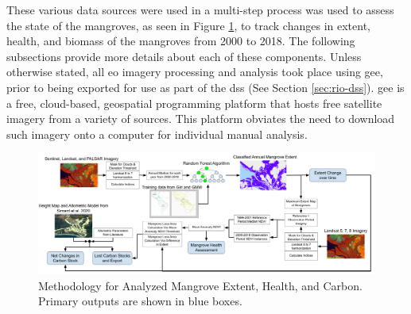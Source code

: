 These various data sources were used in a multi-step process was used to assess the state of the mangroves, as seen in Figure \ref{fig:extent_method}, to track changes in extent, health, and biomass of the mangroves from 2000 to 2018. The following subsections provide more details about each of these components. Unless otherwise stated, all \ac{eo} imagery processing and analysis took place using \acf{gee}, prior to being exported for use as part of the \ac{dss} (See Section \ref{sec:rio-dss}). \ac{gee} is a free, cloud-based, geospatial programming platform that hosts free satellite imagery from a variety of sources. This platform obviates the need to download such imagery onto a computer for individual manual analysis.

\begin{landscape}
\begin{figure}[t]
	\centering
	\includegraphics[scale=0.225]{Figures/chap4/extent_method.png}
	\caption[Mangrove Analysis Methodology]{Methodology for Analyzed Mangrove Extent, Health, and Carbon. Primary outputs are shown in blue boxes.}
	\label{fig:extent_method}
\end{figure}
\end{landscape}

\paragraph{} \label{sec:rio-mangrove-extent} \leavevmode\newline

